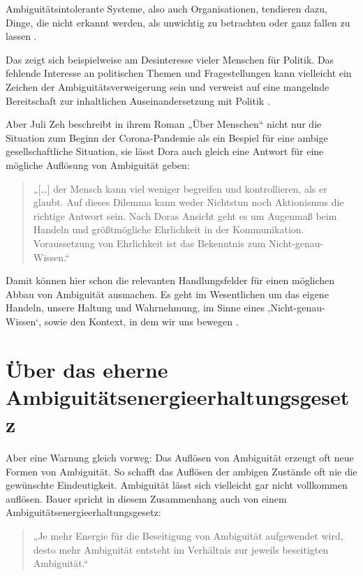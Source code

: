 \documentclass[
  ngerman,
  letterpaper,
  DIV=11]{scrartcl}
\begin{document}
Ambiguitätsintolerante Systeme, also auch Organisationen, tendieren
dazu, Dinge, die nicht erkannt werden, als unwichtig zu betrachten oder
ganz fallen zu lassen \autocite[54]{bauer2018}.

Das zeigt sich beispielweise am Desinteresse vieler Menschen für
Politik. Das fehlende Interesse an politischen Themen und
Fragestellungen kann vielleicht ein Zeichen der Ambiguitätsverweigerung
sein und verweist auf eine mangelnde Bereitschaft zur inhaltlichen
Auseinandersetzung mit Politik \autocite[13 und 25]{bauer2018}.

Aber Juli Zeh beschreibt in ihrem Roman „Über Menschen`` nicht nur die
Situation zum Beginn der Corona-Pandemie als ein Bespiel für eine ambige
gesellschaftliche Situation, sie lässt Dora auch gleich eine Antwort für
eine mögliche Auflösung von Ambiguität geben:

\begin{quote}
„{[}\ldots{]} der Mensch kann viel weniger begreifen und kontrollieren,
als er glaubt. Auf dieses Dilemma kann weder Nichtstun noch Aktionismus
die richtige Antwort sein. Nach Doras Ansicht geht es um Augenmaß beim
Handeln und größtmögliche Ehrlichkeit in der Kommunikation.
Voraussetzung von Ehrlichkeit ist das Bekenntnis zum
Nicht-genau-Wissen.``
\end{quote}

Damit können hier schon die relevanten Handlungsfelder für einen
möglichen Abbau von Ambiguität ausmachen. Es geht im Wesentlichen um das
eigene Handeln, unsere Haltung und Wahrnehmung, im Sinne eines
‚Nicht-genau-Wissen`, sowie den Kontext, in dem wir uns bewegen
\autocite[vgl.][]{kozica2025}.

\section{Über das eherne
Ambiguitätsenergieerhaltungsgesetz}\label{uxfcber-das-eherne-ambiguituxe4tsenergieerhaltungsgesetz}

Aber eine Warnung gleich vorweg: Das Auflösen von Ambiguität erzeugt oft
neue Formen von Ambiguität. So schafft das Auflösen der ambigen Zustände
oft nie die gewünschte Eindeutigkeit. Ambiguität lässt sich vielleicht
gar nicht vollkommen auflösen. Bauer spricht in diesem Zusammenhang auch
von einem Ambiguitätsenergieerhaltungsgesetz:

\begin{quote}
„Je mehr Energie für die Beseitigung von Ambiguität aufgewendet wird,
desto mehr Ambiguität entsteht im Verhältnis zur jeweils beseitigten
Ambiguität.`` \autocite[76]{bauer2018}
\end{quote}
\end{document}
